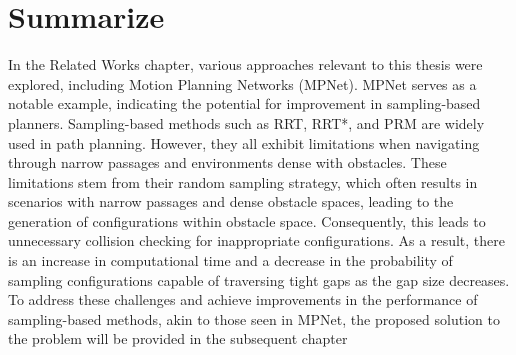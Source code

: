 \documentclass{ctuthesis}
\begin{document}
\section{Summarize}
In the Related Works chapter, various approaches relevant to this thesis were explored, 
including Motion Planning Networks (MPNet). 
MPNet serves as a notable example, indicating the potential for improvement in 
sampling-based planners. 
Sampling-based methods such as RRT, RRT*, and PRM are widely used in path planning. 
However, they all exhibit limitations when navigating through narrow passages and 
environments dense with obstacles. 
These limitations stem from their random sampling strategy, 
which often results in scenarios with narrow passages and dense obstacle spaces, 
leading to the generation of configurations within obstacle space. 
Consequently, this leads to unnecessary collision checking for inappropriate configurations. 
As a result, there is an increase in computational time and a decrease in the probability 
of sampling configurations capable of traversing tight gaps as the gap size decreases. 
To address these challenges and achieve improvements in the performance of sampling-based methods,
akin to those seen in MPNet, 
the proposed solution to the problem will be provided in the subsequent chapter
\end{document}
